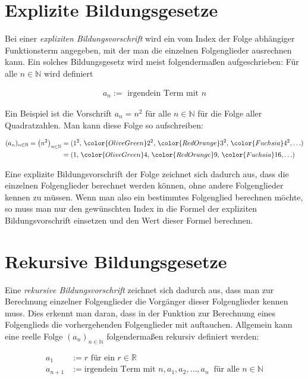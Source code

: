 \documentclass[fontsize=9pt,
               parskip=half-,
               DIV=14,
               listof=chapterentry,
               tocflat]{scrbook}
\begin{document}
\section{Explizite Bildungsgesetze}

Bei einer \emph{expliziten Bildungsvorschrift} wird ein vom Index der Folge abhängiger Funktionsterm angegeben, mit der man die einzelnen Folgenglieder ausrechnen kann. Ein solches Bildungsgesetz wird meist folgendermaßen aufgeschrieben: Für alle $n\in \mathbb {N} $ wird definiert

\begin{align*}
a_{n}:={\text{ irgendein Term mit }}n
\end{align*}

Ein Beispiel ist die Vorschrift $a_{n}=n^{2}$ für alle $n\in \mathbb {N} $ für die Folge aller Quadratzahlen. Man kann diese Folge so aufschreiben:

\begin{align*}
(a_{n})_{n\in \mathbb {N} }=\left(n^{2}\right)_{n\in \mathbb {N} }&=(1^{2},\,{\color {OliveGreen}2^{2}},\,{\color {RedOrange}3^{2}},\,{\color {Fuchsia}4^{2}},\ldots )\\&=(1,\,{\color {OliveGreen}4},\,{\color {RedOrange}9},\,{\color {Fuchsia}16},\ldots )
\end{align*}

Eine explizite Bildungsvorschrift der Folge zeichnet sich dadurch aus, dass die einzelnen Folgenglieder berechnet werden können, ohne andere Folgenglieder kennen zu müssen. Wenn man also ein bestimmtes Folgenglied berechnen möchte, so muss man nur den gewünschten Index in die Formel der expliziten Bildungsvorschrift einsetzen und den Wert dieser Formel berechnen.

\section{Rekursive Bildungsgesetze}

Eine \emph{rekursive Bildungsvorschrift} zeichnet sich dadurch aus, dass man zur Berechnung einzelner Folgenglieder die Vorgänger dieser Folgenglieder kennen muss. Dies erkennt man daran, dass in der Funktion zur Berechnung eines Folgenglieds die vorhergehenden Folgenglieder mit auftauchen. Allgemein kann eine reelle Folge $(a_{n})_{n\in \mathbb {N} }$ folgendermaßen rekursiv definiert werden:

\begin{align*}
a_{1}&:=r{\text{ für ein }}r\in \mathbb {R} \\[0.3em]a_{n+1}&:={\text{irgendein Term mit }}n,a_{1},a_{2},\ldots ,a_{n}\ {\text{ für alle }}n\in \mathbb {N} 
\end{align*}
\end{document}

